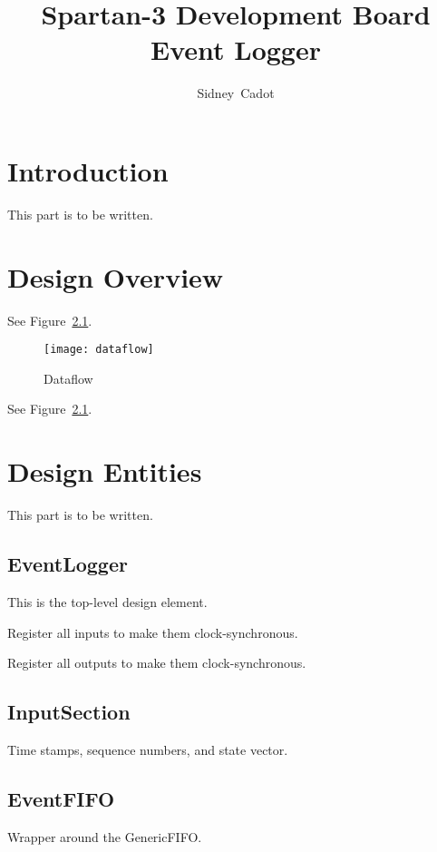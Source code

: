 \documentclass[a4paper,twoside]{report}
\title{Spartan-3 Development Board Event Logger}
\author{Sidney~Cadot}
\begin{document}
\maketitle
\tableofcontents

\chapter{Introduction}

This part is to be written.

\chapter{Design Overview}

See Figure~\ref{fig:dataflow}.

\begin{figure}[h]
\begin{center}
\texttt{[image: dataflow]}
\end{center}
\caption{Dataflow}
\label{fig:dataflow} %
\end{figure}

See Figure~\ref{fig:dataflow}.

\chapter{Design Entities}

This part is to be written.

\section{EventLogger}

This is the top-level design element.

Register all inputs to make them clock-synchronous.

Register all outputs to make them clock-synchronous.

\section{InputSection}

Time stamps, sequence numbers, and state vector.

\section{EventFIFO}

Wrapper around the GenericFIFO.
\end{document}

